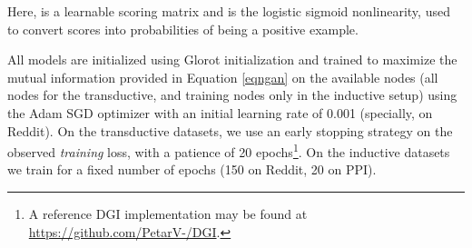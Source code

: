 \documentclass{article} \usepackage{iclr2019_conference,times}
\begin{document}
Here,  is a learnable scoring matrix and  is the logistic sigmoid nonlinearity, used to convert scores into probabilities of  being a positive example.

All models are initialized using Glorot initialization \citep{glorot2010understanding} and trained to maximize the mutual information provided in Equation \ref{eqngan} on the available nodes (all nodes for the transductive, and training nodes only in the inductive setup) using the Adam SGD optimizer \citep{kingma2014adam} with an initial learning rate of 0.001 (specially,  on Reddit). On the transductive datasets, we use an early stopping strategy on the observed \emph{training} loss, with a patience of 20 epochs\footnote{
A reference DGI implementation may be found at \url{https://github.com/PetarV-/DGI}.}. On the inductive datasets we train for a fixed number of epochs (150 on Reddit, 20 on PPI).
\end{document}
